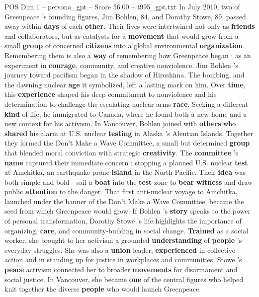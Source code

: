 \begin{textsample}{POS Dim 1 – persona\_gpt – Score 56.00 – t995\_gpt.txt}  \label{ex:f1_pos_021}
In July 2010, two of Greenpeace ’s founding figures, Jim Bohlen, 84, and Dorothy Stowe, 89, passed away within \textbf{days} of each \textbf{other}.
Their lives were intertwined not only as \textbf{friends} and collaborators, but as catalysts for a \textbf{movement} that would grow from a small \textbf{group} of concerned \textbf{citizens} into a global environmental \textbf{organization}.
Remembering them is also a \textbf{way} of remembering how Greenpeace began : as an experiment in \textbf{courage}, community, and creative nonviolence.
Jim Bohlen ’s journey toward pacifism began in the shadow of Hiroshima.
The bombing, and the dawning nuclear \textbf{age} it symbolized, left a lasting mark on him.
Over \textbf{time}, this \textbf{experience} shaped his deep commitment to nonviolence and his determination to challenge the escalating nuclear arms \textbf{race}.
Seeking a different \textbf{kind} of life, he immigrated to Canada, where he found both a new home and a new context for his activism.
In Vancouver, Bohlen joined with \textbf{others} who \textbf{shared} his alarm at U.S. nuclear \textbf{testing} in Alaska ’s Aleutian Islands.
Together they formed the Don't Make a Wave Committee, a small but determined \textbf{group} that blended moral conviction with strategic \textbf{creativity}.
The \textbf{committee} ’s \textbf{name} captured their immediate concern : stopping a planned U.S. nuclear \textbf{test} at Amchitka, an earthquake-prone \textbf{island} in the North Pacific.
Their \textbf{idea} was both simple and bold—sail a \textbf{boat} into the \textbf{test} zone to \textbf{bear} \textbf{witness} and draw public \textbf{attention} to the danger.
That first anti-nuclear voyage to Amchitka, launched under the banner of the Don't Make a Wave Committee, became the seed from which Greenpeace would grow.
If Bohlen ’s \textbf{story} speaks to the power of personal transformation, Dorothy Stowe ’s life highlights the importance of organizing, \textbf{care}, and community-building in social change. \textbf{Trained} as a social worker, she brought to her activism a grounded \textbf{understanding} of \textbf{people} ’s everyday struggles.
She was also a \textbf{union} leader, \textbf{experienced} in collective action and in standing up for justice in workplaces and communities.
Stowe ’s \textbf{peace} activism connected her to broader \textbf{movements} for disarmament and social justice.
In Vancouver, she became \textbf{one} of the central figures who helped knit together the diverse \textbf{people} who would launch Greenpeace.

\end{textsample}
